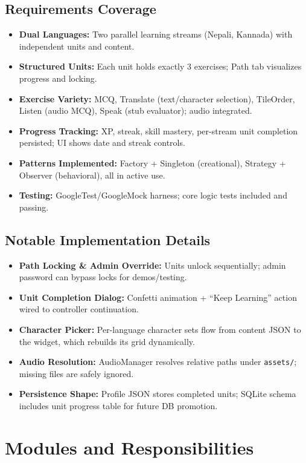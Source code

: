 \documentclass{article}
\begin{document}
\subsection{Requirements Coverage}
\begin{itemize}
  \item \textbf{Dual Languages:} Two parallel learning streams (Nepali, Kannada) with independent units and content.
  \item \textbf{Structured Units:} Each unit holds exactly 3 exercises; Path tab visualizes progress and locking.
  \item \textbf{Exercise Variety:} MCQ, Translate (text/character selection), TileOrder, Listen (audio MCQ), Speak (stub evaluator); audio integrated.
  \item \textbf{Progress Tracking:} XP, streak, skill mastery, per-stream unit completion persisted; UI shows date and streak controls.
  \item \textbf{Patterns Implemented:} Factory + Singleton (creational), Strategy + Observer (behavioral), all in active use.
  \item \textbf{Testing:} GoogleTest/GoogleMock harness; core logic tests included and passing.
\end{itemize}

\subsection{Notable Implementation Details}
\begin{itemize}
  \item \textbf{Path Locking \& Admin Override:} Units unlock sequentially; admin password can bypass locks for demos/testing.
  \item \textbf{Unit Completion Dialog:} Confetti animation + “Keep Learning” action wired to controller continuation.
  \item \textbf{Character Picker:} Per-language character sets flow from content JSON to the widget, which rebuilds its grid dynamically.
  \item \textbf{Audio Resolution:} AudioManager resolves relative paths under \texttt{assets/}; missing files are safely ignored.
  \item \textbf{Persistence Shape:} Profile JSON stores completed units; SQLite schema includes unit progress table for future DB promotion.
\end{itemize}

\section{Modules and Responsibilities}
\end{document}
